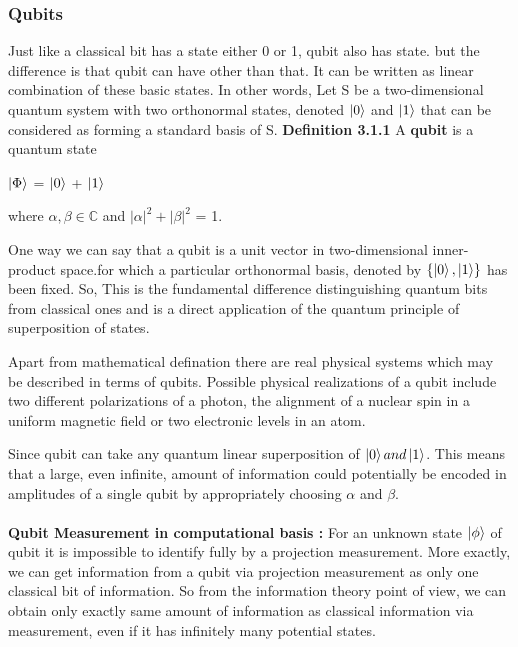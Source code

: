 \documentclass[11 pt]{article}
\theoremstyle{definition}
\theoremstyle{remark}
\begin{document}
\subsubsection{Qubits}
Just like a classical bit has a state either 0 or 1, qubit also has state. but the difference is that qubit can have other than that. It can be written as linear combination of these basic states. In other words, Let S be a two-dimensional quantum system with two orthonormal states, denoted $\ket{0}$ and $\ket{1}$ that can be considered as forming a standard basis of S. \vspace{5mm} \newline
\textbf{Definition 3.1.1} A \textbf{qubit} is a quantum state 
\begin{center}
 $\ket{\Phi}$ = \alpha$\ket{0}$ + \beta$\ket{1}$
\end{center}
where $\alpha,\beta \in \mathbb{C}$ and $\left|\alpha\right |^2 + \left|\beta\right|^2 $ = 1.\newline

One way we can say that a qubit is a unit vector in two-dimensional inner-product space.for which a particular orthonormal basis, denoted by $\{\ket{0},\ket{1}\}$ has been fixed. So, This is the fundamental difference distinguishing quantum bits from classical ones and is a direct application of the quantum principle of superposition of states.\par
Apart from mathematical defination there are  real physical systems which
may be described in terms of qubits. Possible physical realizations of a qubit include two different polarizations of a photon, the alignment of a nuclear spin in a uniform magnetic field or two electronic levels in an atom.

Since qubit can take any quantum linear superposition of $\ket{0} and \ket{1}$. This means that a large, even infinite, amount of information could potentially be encoded in amplitudes of a single qubit by appropriately choosing $\alpha$ and $\beta$.\\
\\
\textbf{Qubit Measurement in computational basis :}
For an unknown state $\ket{\phi}$ of qubit it is impossible to identify fully by a projection measurement. More exactly, we can get information from a qubit via projection measurement as only one classical bit of information. So from the information theory point of view, we can obtain only exactly same amount of information as classical information via measurement, even if it has infinitely many potential states.
\end{document}
